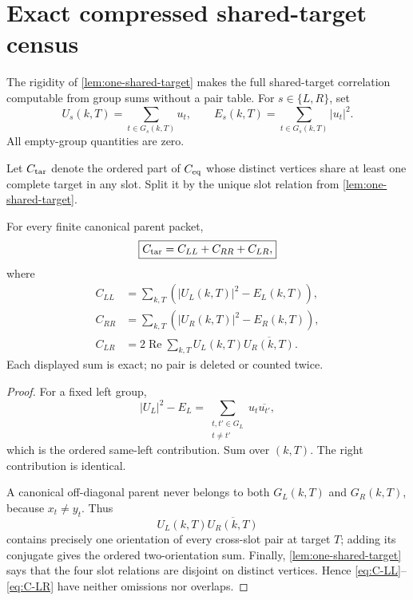 \section{Exact compressed shared-target census}
\label{sec:compressed-census}

The rigidity of \cref{lem:one-shared-target} makes the full
shared-target correlation computable from group sums without a pair
table.  For \(s\in\{L,R\}\), set
\begin{equation}
 U_s(k,T)=\sum_{t\in G_s(k,T)}u_t,\qquad
 E_s(k,T)=\sum_{t\in G_s(k,T)}|u_t|^2.
\label{eq:group-sum-energy}
\end{equation}
All empty-group quantities are zero.

Let \(C_{\mathrm{tar}}\) denote the ordered part of
\(C_{\mathrm{eq}}\) whose distinct vertices share at least one complete
target in any slot.  Split it by the unique slot relation from
\cref{lem:one-shared-target}.

\begin{theorem}
\label{thm:compressed-target-correlation}
For every finite canonical parent packet,
\begin{equation}
 \boxed{
 C_{\mathrm{tar}}=C_{LL}+C_{RR}+C_{LR},}
\label{eq:compressed-Ctar}
\end{equation}
where
\begin{align}
 C_{LL}
 &=
 \sum_{k,T}\left(
 |U_L(k,T)|^2-E_L(k,T)
 \right),
\label{eq:C-LL}\\
 C_{RR}
 &=
 \sum_{k,T}\left(
 |U_R(k,T)|^2-E_R(k,T)
 \right),
\label{eq:C-RR}\\
 C_{LR}
 &=
 2\operatorname{Re}
 \sum_{k,T}U_L(k,T)\overline{U_R(k,T)}.
\label{eq:C-LR}
\end{align}
Each displayed sum is exact; no pair is deleted or counted twice.
\end{theorem}

\begin{proof}
For a fixed left group,
\[
 |U_L|^2-E_L
 =
 \sum_{\substack{t,t'\in G_L\\t\ne t'}}
 u_t\overline{u_{t'}},
\]
which is the ordered same-left contribution.  Sum over \((k,T)\).
The right contribution is identical.

A canonical off-diagonal parent never belongs to both
\(G_L(k,T)\) and \(G_R(k,T)\), because \(x_t\ne y_t\).  Thus
\[
 U_L(k,T)\overline{U_R(k,T)}
\]
contains precisely one orientation of every cross-slot pair at
target \(T\); adding its conjugate gives the ordered two-orientation
sum.  Finally, \cref{lem:one-shared-target} says that the four slot
relations are disjoint on distinct vertices.  Hence
\eqref{eq:C-LL}--\eqref{eq:C-LR} have neither omissions nor
overlaps.
\end{proof}

